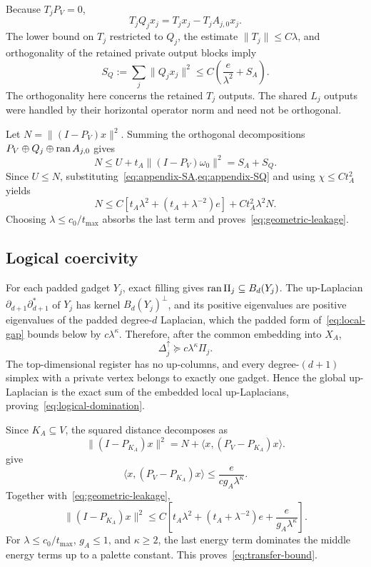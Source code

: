 Because \(T_jP_V=0\),
\[
T_jQ_jx_j=T_jx_j-T_jA_{j,0}x_j.
\]
The lower bound on \(T_j\) restricted to \(Q_j\), the estimate \(\|T_j\|\le C\lambda\), and orthogonality of the retained private output blocks imply
\begin{equation}
\label{eq:appendix-SQ}
S_Q:=\sum_j\|Q_jx_j\|^2
\le C\left(\frac{e}{\lambda^2}+S_A\right).
\end{equation}
The orthogonality here concerns the retained \(T_j\) outputs. The shared \(L_j\) outputs were handled by their horizontal operator norm and need not be orthogonal.

Let \(N=\|(I-P_V)x\|^2\). Summing the orthogonal decompositions \(P_V\oplus Q_j\oplus\operatorname{ran} A_{j,0}\) gives
\[
N\le U+t_A\|(I-P_V)\omega_0\|^2=S_A+S_Q.
\]
Since \(U\le N\), substituting~\cref{eq:appendix-SA,eq:appendix-SQ} and using \(\chi\le Ct_A^2\) yields
\[
N\le C\left[t_A\lambda^2+(t_A+\lambda^{-2})e\right]
+Ct_A^2\lambda^2N.
\]
Choosing \(\lambda\le c_0/t_{\max}\) absorbs the last term and proves~\cref{eq:geometric-leakage}.

\subsection{Logical coercivity}

For each padded gadget \(Y_j\), exact filling gives \(\operatorname{ran}\Pi_j\subseteq B_d(Y_j)\). The up-Laplacian \(\partial_{d+1}\partial_{d+1}^*\) of \(Y_j\) has kernel \(B_d(Y_j)^\perp\), and its positive eigenvalues are positive eigenvalues of the padded degree-\(d\) Laplacian, which the padded form of~\cref{eq:local-gap} bounds below by \(c\lambda^\kappa\). Therefore, after the common embedding into \(X_A\),
\[
\Delta_j^\uparrow\succeq c\lambda^\kappa\Pi_j.
\]
The top-dimensional register has no up-columns, and every degree-\((d+1)\) simplex with a private vertex belongs to exactly one gadget. Hence the global up-Laplacian is the exact sum of the embedded local up-Laplacians, proving~\cref{eq:logical-domination}.

Since \(K_A\subseteq V\), the squared distance decomposes as
\[
\|(I-P_{K_A})x\|^2
=N+\langle x,(P_V-P_{K_A})x\rangle.
\]
 give
\[
\langle x,(P_V-P_{K_A})x\rangle
\le\frac{e}{cg_A\lambda^\kappa}.
\]
Together with~\cref{eq:geometric-leakage},
\[
\|(I-P_{K_A})x\|^2
\le C\left[t_A\lambda^2+(t_A+\lambda^{-2})e
+\frac{e}{g_A\lambda^\kappa}\right].
\]
For \(\lambda\le c_0/t_{\max}\), \(g_A\le1\), and \(\kappa\ge2\), the last energy term dominates the middle energy terms up to a palette constant. This proves~\cref{eq:transfer-bound}.

